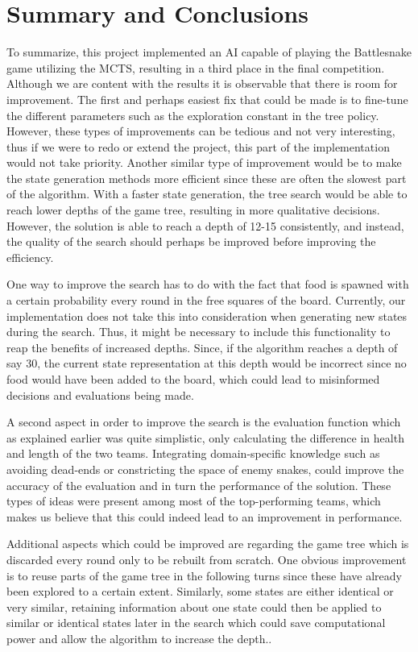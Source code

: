 \documentclass[a4paper,12pt]{article}
\begin{document}
\section{Summary and Conclusions}
\label{sec:summary}
To summarize, this project implemented an AI capable of playing the Battlesnake game utilizing the MCTS, resulting in a third place in the final competition. Although we are content with the results it is observable that there is room for improvement. The first and perhaps easiest fix that could be made is to fine-tune the different parameters such as the exploration constant in the tree policy. However, these types of improvements can be tedious and not very interesting, thus if we were to redo or extend the project, this part of the implementation would not take priority. Another similar type of improvement would be to make the state generation methods more efficient since these are often the slowest part of the algorithm. With a faster state generation, the tree search would be able to reach lower depths of the game tree, resulting in more qualitative decisions. However, the solution is able to reach a depth of 12-15 consistently, and instead, the quality of the search should perhaps be improved before improving the efficiency. 

One way to improve the search has to do with the fact that food is spawned with a certain probability every round in the free squares of the board. Currently, our implementation does not take this into consideration when generating new states during the search. Thus, it might be necessary to include this functionality to reap the benefits of increased depths. Since, if the algorithm reaches a depth of say 30, the current state representation at this depth would be incorrect since no food would have been added to the board, which could lead to misinformed decisions and evaluations being made.

A second aspect in order to improve the search is the evaluation function which as explained earlier was quite simplistic, only calculating the difference in health and length of the two teams. Integrating domain-specific knowledge such as avoiding dead-ends or constricting the space of enemy snakes, could improve the accuracy of the evaluation and in turn the performance of the solution. These types of ideas were present among most of the top-performing teams, which makes us believe that this could indeed lead to an improvement in performance. 

Additional aspects which could be improved are regarding the game tree which is discarded every round only to be rebuilt from scratch. One obvious improvement is to reuse parts of the game tree in the following turns since these have already been explored to a certain extent. Similarly, some states are either identical or very similar, retaining information about one state could then be applied to similar or identical states later in the search which could save computational power and allow the algorithm to increase the depth..
\end{document}
